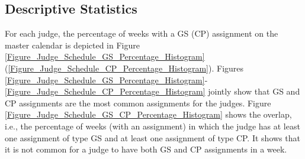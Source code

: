 \documentclass[11pt, oneside]{article}   	%
\theoremstyle{ModifiedStyle}
\begin{document}
	\subsection{Descriptive Statistics}
	  For each judge, the percentage of weeks with a GS (CP) assignment on the master calendar is depicted in Figure \ref{Figure_Judge_Schedule_GS_Percentage_Histogram} (\ref{Figure_Judge_Schedule_CP_Percentage_Histogram}). Figures \ref{Figure_Judge_Schedule_GS_Percentage_Histogram}-\ref{Figure_Judge_Schedule_CP_Percentage_Histogram} jointly show that GS and CP assignments are the most common assignments for the judges. Figure \ref{Figure_Judge_Schedule_GS_CP_Percentage_Histogram} shows the overlap, i.e., the percentage of weeks (with an assignment) in which the judge has at least one assignment of type GS and at least one assignment of type CP. It shows that it is not common for a judge to have both GS and CP assignments in a week.
\end{document}
